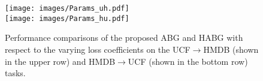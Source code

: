 \begin{figure}[t]
    \centering
    \texttt{[image: images/Params\_uh.pdf]}\\
    \texttt{[image: images/Params\_hu.pdf]}
    \caption{Performance comparisons of the proposed ABG and HABG with respect to the varying loss coefficients on the UCF$\rightarrow$HMDB (shown in the upper row) and HMDB$\rightarrow$UCF (shown in the bottom row) tasks.}
    \label{fig:params}
\end{figure}
